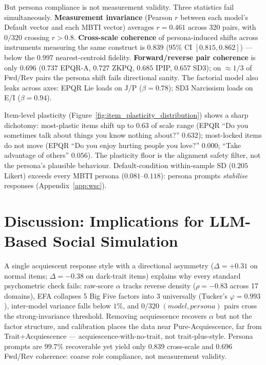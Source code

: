 \documentclass{article}
\begin{document}
But persona compliance is not measurement validity. Three statistics fail simultaneously. \textbf{Measurement invariance} (Pearson $r$ between each model's Default vector and each MBTI vector) averages $r = 0.461$ across 320 pairs, with $0/320$ crossing $r > 0.8$. \textbf{Cross-scale coherence} of persona-induced shifts across instruments measuring the same construct is $0.839$ (95\% CI $[0.815, 0.862]$) --- below the $0.997$ nearest-centroid fidelity. \textbf{Forward/reverse pair coherence} is only $0.696$ ($0.737$ EPQR-A, $0.727$ ZKPQ, $0.685$ IPIP, $0.657$ SD3); on ${\approx}1/3$ of Fwd/Rev pairs the persona shift fails directional sanity. The factorial model also leaks across axes: EPQR Lie loads on J/P ($\beta = 0.78$); SD3 Narcissism loads on E/I ($\beta = 0.94$).

Item-level plasticity (Figure~\ref{fig:item_plasticity_distribution}) shows a sharp dichotomy: most-plastic items shift up to $0.63$ of scale range (EPQR ``Do you sometimes talk about things you know nothing about?'' $0.632$); most-locked items do not move (EPQR ``Do you enjoy hurting people you love?'' $0.000$; ``Take advantage of others'' $0.056$). The plasticity floor is the alignment safety filter, not the persona's plausible behaviour. Default-condition within-sample SD ($0.205$ Likert) exceeds every MBTI persona ($0.081$--$0.118$): persona prompts \emph{stabilise} responses (Appendix~\ref{app:wsc}).


\section{Discussion: Implications for {LLM-Based} Social Simulation}
\label{sec:conclusion}

A single acquiescent response style with a directional asymmetry ($\Delta{=}{+}0.31$ on normal items; $\Delta{=}{-}0.38$ on dark-trait items) explains why every standard psychometric check fails: raw-score $\alpha$ tracks reverse density ($\rho{=}{-}0.83$ across 17 domains), EFA collapses 5 Big Five factors into 3 universally (Tucker's $\varphi{=}0.993$), inter-model variance falls below $1\%$, and $0/320$ $(model, persona)$ pairs cross the strong-invariance threshold. Removing acquiescence recovers $\alpha$ but not the factor structure, and calibration places the data near Pure-Acquiescence, far from Trait+Acquiescence --- acquiescence-with-no-trait, not trait-plus-style. Persona prompts are $99.7\%$ recoverable yet yield only $0.839$ cross-scale and $0.696$ Fwd/Rev coherence: coarse role compliance, not measurement validity.
\end{document}
